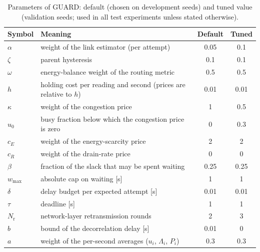 \begin{table}[!htb]
\caption{Parameters of GUARD: default (chosen on development seeds) and tuned value (validation seeds; used in all test experiments unless stated otherwise).\label{tab:guardparams}}
\footnotesize
\begin{tabularx}{\textwidth}{lXcc}
\toprule
\textbf{Symbol} & \textbf{Meaning} & \textbf{Default} & \textbf{Tuned}\\
\midrule
$\alpha$ & weight of the link estimator (per attempt) & 0.05 & 0.1 \\
$\zeta$ & parent hysteresis & 0.1 & 0.1 \\
$\omega$ & energy-balance weight of the routing metric & 0.5 & 0.5 \\
$h$ & holding cost per reading and second (prices are relative to $h$) & 0.01 & 0.01 \\
$\kappa$ & weight of the congestion price & 1 & 0.5 \\
$u_0$ & busy fraction below which the congestion price is zero & 0 & 0.3 \\
$c_E$ & weight of the energy-scarcity price & 2 & 2 \\
$c_R$ & weight of the drain-rate price & 0 & 0 \\
$\beta$ & fraction of the slack that may be spent waiting & 0.25 & 0.25 \\
$w_{\max}$ & absolute cap on waiting [s] & 1 & 1 \\
$\delta$ & delay budget per expected attempt [s] & 0.01 & 0.01 \\
$\tau$ & deadline [s] & 1 & 1 \\
$N_\mathrm{r}$ & network-layer retransmission rounds & 2 & 3 \\
$b$ & bound of the decorrelation delay [s] & 0.01 & 0 \\
$a$ & weight of the per-second averages ($u_i$, $\Lambda_i$, $P_i$) & 0.3 & 0.3 \\
\bottomrule
\end{tabularx}
\end{table}
